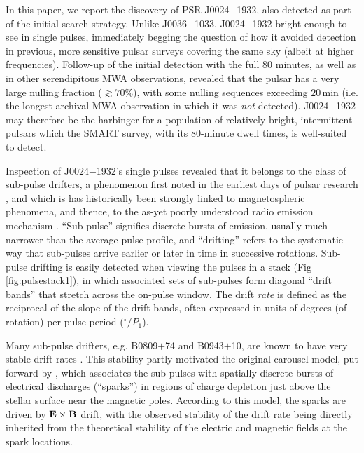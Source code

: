 \documentclass[linenumbers]{aastex631}
\newcommand{\psr}{J0024$-$1932}
\newcommand{\psrnick}{J0036$-$1033}
\newcommand{\nullfraction}{70\%}
\newcommand{\ExB}{\ensuremath{{\bf E}\times{\bf B}}}
\begin{document}
In this paper, we report the discovery of PSR \psr{}, also detected as part of the initial search strategy.
Unlike \psrnick{}, \psr{} bright enough to see in single pulses, immediately begging the question of how it avoided detection in previous, more sensitive pulsar surveys covering the same sky (albeit at higher frequencies).
Follow-up of the initial detection with the full 80 minutes, as well as in other serendipitous MWA observations, revealed that the pulsar has a very large nulling fraction ($\gtrsim\nullfraction$), with some nulling sequences exceeding $20\,$min (i.e. the longest archival MWA observation in which it was \textit{not} detected).
\psr{} may therefore be the harbinger for a population of relatively bright, intermittent pulsars which the SMART survey, with its $80$-minute dwell times, is well-suited to detect.

Inspection of \psr{}'s single pulses revealed that it belongs to the class of sub-pulse drifters, a phenomenon first noted in the earliest days of pulsar research \citep{Drake1968}, and which is has historically been strongly linked to magnetospheric phenomena, and thence, to the as-yet poorly understood radio emission mechanism \citep{Ruderman1975,Rankin1986,Deshpande1999}.
``Sub-pulse'' signifies discrete bursts of emission, usually much narrower than the average pulse profile, and ``drifting'' refers to the systematic way that sub-pulses arrive earlier or later in time in successive rotations.
Sub-pulse drifting is easily detected when viewing the pulses in a stack (Fig \ref{fig:pulsestack1}), in which associated sets of sub-pulses form diagonal ``drift bands'' that stretch across the on-pulse window.
The drift \textit{rate} is defined as the reciprocal of the slope of the drift bands, often expressed in units of degrees (of rotation) per pulse period ($^\circ/P_1$).

Many sub-pulse drifters, e.g. B0809$+$74 and B0943$+$10, are known to have very stable drift rates \citep[e.g.][]{Taylor1971,Deshpande1999}.
This stability partly motivated the original carousel model, put forward by \citet{Ruderman1975}, which associates the sub-pulses with spatially discrete bursts of electrical discharges (``sparks'') in regions of charge depletion just above the stellar surface near the magnetic poles.
According to this model, the sparks are driven by \ExB{} drift, with the observed stability of the drift rate being directly inherited from the theoretical stability of the electric and magnetic fields at the spark locations.
\end{document}
